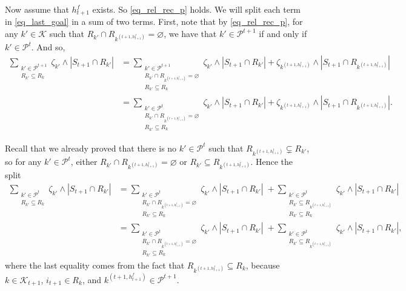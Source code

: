 \documentclass[
  11pt,
  a4paper,
]{article}
\theoremstyle{plain}
\theoremstyle{plain}
\theoremstyle{definition}
\theoremstyle{plain}
\theoremstyle{definition}
\theoremstyle{remark}
\begin{document}
Now assume that \(h^f_{t+1}\) exists. So \eqref{eq_rel_rec_p} holds. We
will split each term in \eqref{eq_last_goal} in a sum of two terms.
First, note that by \eqref{eq_rel_rec_p}, for any \(k'\in\mathcal{K}\)
such that \(R_{k'}\cap  R_{  k^{(t+1,h^f_{t+1})} } = \varnothing\), we
have that \(k'\in\mathcal{P}^{t+1}\) if and only if
\(k'\in \mathcal{P}^{t}\). And so, \begin{align*}
 \sum_{\substack{k'\in\mathcal{P}^{t+1}\\R_{k'}\subseteq R_k}} \zeta_{k'}\wedge |S_{t+1}\cap R_{k'}| &=  \sum_{\substack{k'\in\mathcal{P}^{t+1}\\R_{k'}\cap  R_{  k^{(t+1,h^f_{t+1})} } = \varnothing \\R_{k'}\subseteq R_k }} \zeta_{k'}\wedge |S_{t+1}\cap R_{k'}| +  \zeta_{ k^{(t+1,h^f_{t+1})}}\wedge |S_{t+1}\cap R_{ k^{(t+1,h^f_{t+1})}}|\\ 
 &=  \sum_{\substack{k'\in\mathcal{P}^{t}\\R_{k'}\cap  R_{  k^{(t+1,h^f_{t+1})} } = \varnothing \\R_{k'}\subseteq R_k }} \zeta_{k'}\wedge |S_{t+1}\cap R_{k'}| +  \zeta_{ k^{(t+1,h^f_{t+1})}}\wedge |S_{t+1}\cap R_{ k^{(t+1,h^f_{t+1})}}|.
\end{align*}

Recall that we already proved that there is no \(k'\in \mathcal{P}^t\)
such that \(R_{  k^{(t+1,h^f_{t+1})} }\subsetneq R_{k'}\), so for any
\(k'\in \mathcal{P}^t\), either
\(R_{k'}\cap  R_{  k^{(t+1,h^f_{t+1})} } = \varnothing\) or
\(R_{k'}\subseteq  R_{  k^{(t+1,h^f_{t+1})}}\). Hence the split
\begin{align*}
 \sum_{\substack{k'\in\mathcal{P}^{t}\\R_{k'}\subseteq R_k}} \zeta_{k'}\wedge |S_{t+1}\cap R_{k'}| &=  \sum_{\substack{k'\in\mathcal{P}^{t}\\R_{k'}\cap  R_{  k^{(t+1,h^f_{t+1})} } = \varnothing \\R_{k'}\subseteq R_k }} \zeta_{k'}\wedge |S_{t+1}\cap R_{k'}|  \;   + \sum_{\substack{k'\in\mathcal{P}^{t}\\R_{k'}\subseteq  R_{  k^{(t+1,h^f_{t+1})}}\\ R_{k'}\subseteq R_k}} \zeta_{k'}\wedge |S_{t+1}\cap R_{k'}|\\
 &=\sum_{\substack{k'\in\mathcal{P}^{t}\\R_{k'}\cap  R_{  k^{(t+1,h^f_{t+1})} } = \varnothing \\R_{k'}\subseteq R_k }} \zeta_{k'}\wedge |S_{t+1}\cap R_{k'}|  \;   + \sum_{\substack{k'\in\mathcal{P}^{t}\\R_{k'}\subseteq  R_{  k^{(t+1,h^f_{t+1})}}}} \zeta_{k'}\wedge |S_{t+1}\cap R_{k'}|,
\end{align*} where the last equality comes from the fact that
\(R_{  k^{(t+1,h^f_{t+1})} }\subseteq R_k\), because
\(k\in\mathcal{K}_{t+1}\), \(i_{t+1}\in R_k\), and
\(k^{(t+1,h^f_{t+1})}\in \mathcal{P}^{t+1}\).
\end{document}
